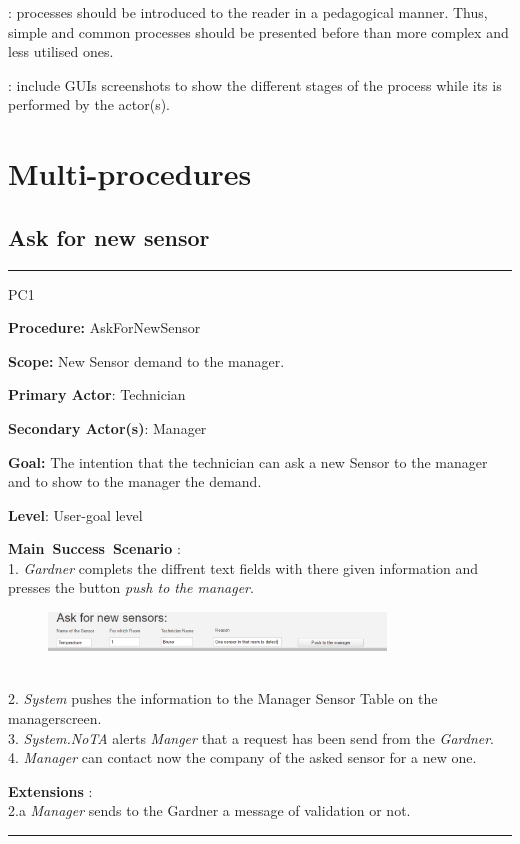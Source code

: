 : processes should be introduced to the
reader in a pedagogical manner. Thus, simple and common processes should be presented before
than more complex and less utilised ones.

: include GUIs screenshots to show the
different stages of the process while its is performed by the actor(s).






\section{Multi-procedures}

\subsection{Ask for new sensor}

\vspace{0.5cm}
\hrule
\hfill \break
\begin{lyxlist}{PC1}
\small{
\item [\textbf{Procedure:}] AskForNewSensor
\item [\textbf{Scope:}] New Sensor demand to the manager.
\item [\textbf{Primary Actor}:] Technician
\item [\textbf{Secondary Actor(s)}:] Manager
\item [\textbf{Goal:}] The intention that the technician can ask a new Sensor to
the manager and to show to the manager the demand.
\item [\textbf{Level}:] User-goal level
\item [\textbf{Main~Success~Scenario}]:\\
1. \emph{Gardner} complets the diffrent text fields with there given
information and presses the button \emph{push to the manager}. 
\begin{figure}
\includegraphics[width=0.8\textwidth]{images/askforsensor.eps}
\end{figure}\\
2. \emph{System} pushes the information to the Manager Sensor Table on the
 managerscreen. \\
3. \emph{System.NoTA} alerts \emph{Manger} that a request has been send from
the \emph{Gardner}.\\
4. \emph{Manager} can contact now the company of the asked sensor for a new
one.\\
\item [\textbf{Extensions}]:\\
2.a  \emph{Manager} sends to the Gardner a message of
validation or not.\\
}
\end{lyxlist}
\hfill \break
\hrule
\vspace{0.5cm}


